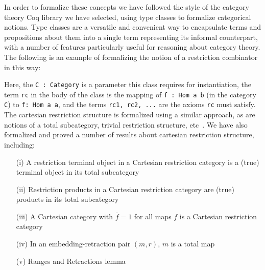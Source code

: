 \documentclass{entcs} \usepackage{entcsmacro}
\begin{document}
In order to formalize these concepts we have followed the style of the category theory Coq library we have selected, using type classes to formalize categorical notions. Type classes are a versatile and convenient way to encapsulate terms and propositions about them into a single term representing its informal counterpart, with a number of features particularly useful for reasoning about category theory. The following is an example of formalizing the notion of a restriction combinator in this way:


Here, the {\tt \small C : Category} is a parameter this class requires for instantiation, the term {\tt \small rc} in the body of the class is the mapping of {\tt \small f : Hom a b} (in the category {\tt \small C}) to {\tt \small f: Hom a a}, and the terms {\tt \small rc1, rc2, ...} are the axioms {\tt \small rc} must satisfy. The cartesian restriction structure is formalized using a similar approach, as are notions of a total subcategory, trivial restriction structure, etc~\cite{Turing}. We have also formalized and proved a number of results about cartesian restriction structure, including:

\begin{itemize}
	\item[(i)] A restriction terminal object in a Cartesian restriction category is a (true) terminal object in its total subcategory~\cite{Turing}
	
	\item[(ii)] Restriction products in a Cartesian restriction category are (true) products in its total subcategory~\cite{Turing}
	
	\item[(iii)] A Cartesian category with $\overline{f} = 1$ for all maps $f$ is a Cartesian restriction category~\cite{Turing}
	
	\item[(iv)] In an embedding-retraction pair $(m, r)$, $m$ is a total map~\cite{Restriction}
	
	\item[(v)] Ranges and Retractions lemma~\cite{MyThesis} 
\end{itemize}
\end{document}
